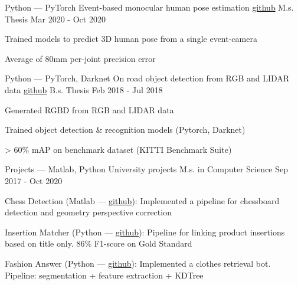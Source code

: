

\begin{cventries}


  \cventry
  {Python --- PyTorch}
  {Event-based monocular human pose estimation \tiny \href{https://github.com/gianscarpe/event-camera}{github}}
  {M.s. Thesis}
  {Mar 2020 - Oct 2020}
  {
    \begin{cvitems} %
    \item Trained models to predict 3D human pose from a single event-camera
	\item Average of 80mm per-joint precision error 
    \end{cvitems}
  }


  \cventry
  {Python --- PyTorch, Darknet} %
  {On road object detection from RGB and LIDAR data \tiny \href{https://github.com/gianscarpe/bachelor_thesis}{github}} %
  {B.s. Thesis} %
  {Feb 2018 - Jul 2018} %
  {
    \begin{cvitems} %
    \item Generated RGBD from RGB and LIDAR data
    \item Trained object detection \& recognition models (Pytorch, Darknet)
    \item > 60\% mAP on benchmark dataset (KITTI Benchmark Suite)
    \end{cvitems}
  }


  \cventry
  {Projects --- Matlab, Python}
  {University projects}
  {M.s. in Computer Science}
  {Sep 2017 - Oct 2020}
  {
    \begin{cvitems} %
    \item Chess Detection (Matlab --- \href{https://github.com/gianscarpe/chess\_detection}{github}): Implemented a pipeline for chessboard detection and geometry perspective correction
    \item Insertion Matcher (Python --- \href{https://github.com/belerico/insertion-matcher}{github}): Pipeline for linking product insertions based on title only. 86\% F1-score on Gold Standard
    \item Fashion Answer (Python --- \href{https://github.com/gianscarpe/fashion-answer}{github}): Implemented a clothes retrieval bot. Pipeline: segmentation + feature extraction + KDTree    
    \end{cvitems}
  }
\end{cventries}

